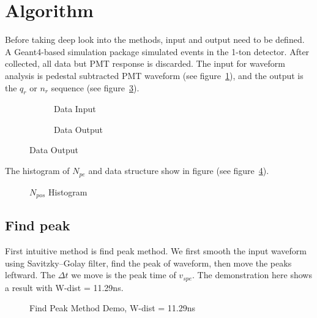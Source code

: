 \section{Algorithm} %

Before taking deep look into the methods, input and output need to be defined. A Geant4\cite{agostinelli_geant4simulation_2003}-based simulation package simulated events in the 1-ton detector\cite{wang_design_2017}. After collected, all data but PMT response is discarded. The input for waveform analysis is pedestal subtracted PMT waveform (see figure~\ref{fig:input}), and the output is the $q_{r}$ or $n_{r}$ sequence (see figure~\ref{fig:output}). 

\begin{figure}[H]
\begin{minipage}[b]{.5\textwidth}
\begin{figure}[H]
    \centering
    \resizebox{\textwidth}{!}{}
    \caption{\label{fig:input} Data Input}
\end{figure}
\end{minipage}
\begin{minipage}[b]{.5\textwidth}
\begin{figure}[H]
    \centering
    \resizebox{\textwidth}{!}{}
    \caption{\label{fig:output} Data Output}
\end{figure}
\end{minipage}
\end{figure}

The histogram of $N_{pe}$ and data structure show in figure (see figure~\ref{fig:penum}). 

\begin{figure}[H]
    \centering
    \scalebox{0.4}{}
    \caption{\label{fig:penum} $N_{pos}$ Histogram}
\end{figure}

\subsection{Find peak}
First intuitive method is find peak method. We first smooth the input waveform using Savitzky–Golay filter, find the peak of waveform, then move the peaks leftward. The $\Delta t$ we move is the peak time of $v_{spe}$. The demonstration here shows a result with W-dist = 11.29ns. 

\begin{figure}[H]
    \centering
    \scalebox{0.4}{}
    \caption{Find Peak Method Demo, W-dist = 11.29ns}
\end{figure}

